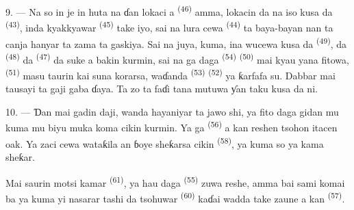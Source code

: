 \VUsaut{3.0mm}
\VUsaut{3.0mm}

9. --- Na so in je in huta na ɗan lokaci a  \textsuperscript{(46)} amma, lokacin da na iso kusa da  \textsuperscript{(43)}, inda kyakkyawar  \textsuperscript{(45)} take iyo, sai na lura cewa
 \textsuperscript{(44)} ta baya-bayan nan ta canja hanyar
ta zama  ta gaskiya. Sai na juya, kuma, ina wucewa kusa
da  \textsuperscript{(49)}, da  \textsuperscript{(48)} da 
\textsuperscript{(47)} da suke a bakin kurmin, sai na ga daga
 \textsuperscript{(54)} 
\textsuperscript{(50)} mai kyau yana fitowa, 
\textsuperscript{(51)} masu taurin kai suna korarsa, waɗanda
 \textsuperscript{(53)} 
\textsuperscript{(52)} ya ƙarfafa su. Dabbar mai tausayi ta gaji gaba
ɗaya. Ta zo ta faɗi tana mutuwa ƴan taku kusa da ni.

10. --- Ɗan mai gadin daji, wanda hayaniyar  ta
jawo shi, ya fito daga gidan mu kuma mu biyu muka koma cikin kurmin.
Ya ga  \textsuperscript{(56)} a kan
reshen tsohon itacen oak. Ya zaci cewa wataƙila an ɓoye sheƙarsa cikin
 \textsuperscript{(58)}, ya kuma so ya kama sheƙar.

Mai saurin motsi kamar  \textsuperscript{(61)}, ya hau
daga  \textsuperscript{(55)} zuwa reshe, amma bai sami komai
ba ya kuma yi nasarar tashi da tsohuwar 
\textsuperscript{(60)} kaɗai wadda take zaune a kan 
\textsuperscript{(57)}.

\VUsaut{4.0mm}
\VUfilet{22mm}
